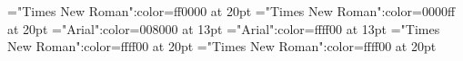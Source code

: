 \documentclass[a4paper]{article}
\begin{document}
\pagestyle{plain}
\sloppy
\setlength{\parfillskip}{0pt plus 1fil}
\font\ta="Times New Roman":color=ff0000 at 20pt
\font\tbta="Times New Roman":color=0000ff at 20pt
\font\tctbta="Arial":color=008000 at 13pt
\font\tdtctbta="Arial":color=ffff00 at 13pt
\font\tdtbta="Times New Roman":color=ffff00 at 20pt
\font\tdta="Times New Roman":color=ffff00 at 20pt

\newpage 
\thispagestyle{empty} 
\mbox{} 
\newpage 
\newpage 
\setcounter{page}{1} 
\pagestyle{fancy} 








\end{document}
